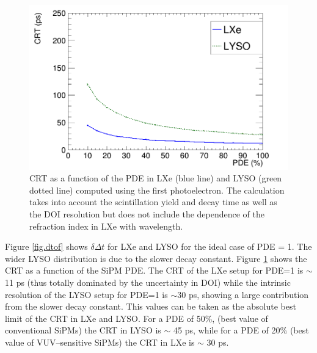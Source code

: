 \documentclass[11pt,a4paper]{article}
\begin{document}
\begin{figure}[!bhtp]
	\centering
	\includegraphics[scale=0.4]{img/CRTvsPDELXeLYSONoJitterFstPE.png}
	\caption{\label{fig.crt1} CRT as a function of the PDE in LXe (blue line) and LYSO (green dotted line) computed using the first photoelectron. The calculation takes into account the scintillation yield and decay time as well as the DOI resolution but does not include
	the dependence of the refraction index in LXe with wavelength.}
\end{figure}

 Figure \ref{fig.dtof} shows $\delta \Delta t$ for LXe and LYSO for the ideal case of PDE = 1. The wider LYSO distribution is due to the slower decay constant.  Figure \ref{fig.crt1} shows the CRT as a function of the
 SiPM PDE. The CRT of the LXe setup for PDE=1 is $\sim$11 ps (thus totally dominated by the uncertainty in DOI) while the intrinsic resolution of the LYSO setup for PDE=1 is $\sim$30 ps, showing a large contribution from the slower decay constant. This values can be taken as the absolute best limit of the CRT in LXe and LYSO. For a PDE of 50\%, (best value of conventional SiPMs) the CRT in LYSO is $\sim$ 45 ps, while for a PDE of 20\% (best value of VUV--sensitive SiPMs) the CRT in LXe is $\sim$ 30 ps.   
\end{document}
